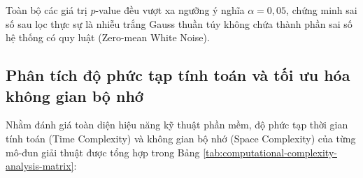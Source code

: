 \begin{table}[H]
\centering
\caption{Kết quả kiểm định giả thuyết thống kê tính chuẩn của sai số bám bắt}
\label{tab:statistical-hypothesis-testing-results}
\end{table}

Toàn bộ các giá trị $p$-value đều vượt xa ngưỡng ý nghĩa $\alpha = 0{,}05$, chứng minh sai số sau lọc thực sự là nhiễu trắng Gauss thuần túy không chứa thành phần sai số hệ thống có quy luật (Zero-mean White Noise).

\subsection{Phân tích độ phức tạp tính toán và tối ưu hóa không gian bộ nhớ}

\hspace{0.5cm} Nhằm đánh giá toàn diện hiệu năng kỹ thuật phần mềm, độ phức tạp thời gian tính toán (Time Complexity) và không gian bộ nhớ (Space Complexity) của từng mô-đun giải thuật được tổng hợp trong Bảng \ref{tab:computational-complexity-analysis-matrix}:

